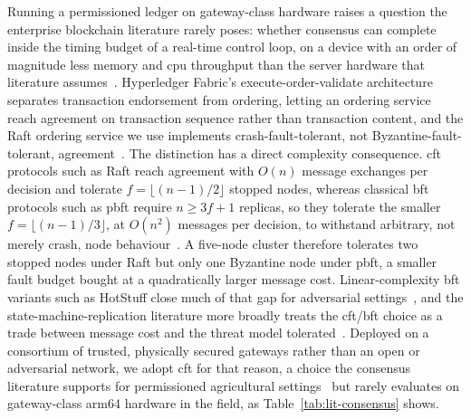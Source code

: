 Running a permissioned ledger on gateway-class hardware raises a question
the enterprise blockchain literature rarely poses: whether consensus can
complete inside the timing budget of a real-time control loop, on a device
with an order of magnitude less memory and \gls{cpu} throughput than the
server hardware that literature assumes~\cite{tar2023fabric, jayaram2023hyperledger, ibmFabric}. Hyperledger Fabric's execute-order-validate
architecture separates transaction endorsement from ordering, letting an
ordering service reach agreement on transaction sequence rather than
transaction content, and the Raft ordering service we use
implements crash-fault-tolerant, not Byzantine-fault-tolerant,
agreement~\cite{ongaro2014raft, orderingServiceDoc}. The distinction has a
direct complexity consequence. \gls{cft} protocols such as Raft reach
agreement with $O(n)$ message exchanges per decision and tolerate
$f = \lfloor (n-1)/2 \rfloor$ stopped nodes, whereas classical
\gls{bft} protocols such as \gls{pbft} require $n \geq 3f+1$ replicas,
so they tolerate the smaller
$f = \lfloor (n-1)/3 \rfloor$, at $O(n^2)$ messages per decision, to
withstand arbitrary, not merely crash, node
behaviour~\cite{castro1999practical, ongaro2014raft}. A five-node
cluster therefore tolerates two stopped nodes under Raft but only one
Byzantine node under \gls{pbft}, a smaller fault budget bought at a
quadratically larger message cost. Linear-complexity \gls{bft} variants
such as HotStuff
close much of that gap for adversarial settings~\cite{yin2019hotstuff}, and
the state-machine-replication literature more broadly treats the
\gls{cft}/\gls{bft} choice as a trade between message cost and the
threat model tolerated~\cite{bessani2014state}. Deployed on a
consortium of trusted, physically secured gateways rather than an open or
adversarial network, we adopt \gls{cft} for that reason, a choice the
consensus literature supports for permissioned agricultural
settings~\cite{dube2024fabricIrrigation} but rarely evaluates on
gateway-class \gls{arm64} hardware in the field, as
Table~\ref{tab:lit-consensus} shows.

